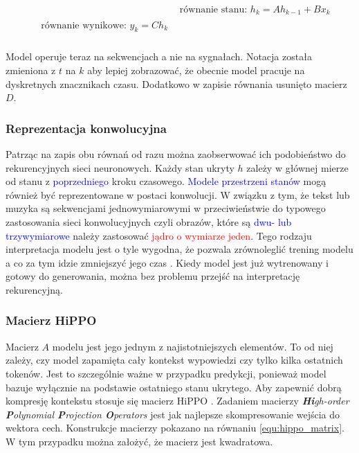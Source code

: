 \documentclass[data-science]{agh-wi} %
\begin{document}
\begin{align}
     & \text{równanie stanu: }h_k = Ah_{k-1} + Bx_k \label{equ:rownanie_stanu_seq} \\
    \begin{split}
        &\text{równanie wynikowe: }y_k = Ch_k \label{equ:rownanie_wynikowe_seq} \\
    \end{split}
\end{align}

Model operuje teraz na sekwencjach a nie na sygnałach. Notacja została zmieniona z $t$ na $k$ aby lepiej zobrazować, że obecnie model pracuje na dyskretnych znacznikach czasu. Dodatkowo w zapisie równania usunięto macierz $D$.

\subsubsection*{Reprezentacja konwolucyjna}
Patrząc na zapis obu równań od razu można zaobserwować ich podobieństwo do rekurencyjnych sieci neuronowych. Każdy stan ukryty $h$ zależy w głównej mierze od stanu z \textcolor{blue}{poprzedniego} kroku czasowego. \textcolor{blue}{Modele przestrzeni stanów} mogą również być reprezentowane w postaci konwolucji. W związku z tym, że tekst lub muzyka są sekwencjami jednowymiarowymi w przeciwieństwie do typowego zastosowania sieci konwolucyjnych czyli obrazów, które są \textcolor{blue}{dwu- lub trzywymiarowe} należy zastosować \textcolor{red}{jądro o wymiarze jeden}. Tego rodzaju interpretacja modelu jest o tyle wygodna, że pozwala zrównoleglić trening modelu a co za tym idzie zmniejszyć jego czas \cite{ssm_notacja}. Kiedy model jest już wytrenowany i gotowy do generowania, można bez problemu przejść na interpretację rekurencyjną.

\subsubsection*{Macierz HiPPO} %
Macierz $A$ modelu jest jego jednym z najistotniejszych elementów. To od niej zależy, czy model zapamięta cały kontekst wypowiedzi czy tylko kilka ostatnich tokenów. Jest to szczególnie ważne w przypadku predykcji, ponieważ model bazuje wyłącznie na podstawie ostatniego stanu ukrytego. Aby zapewnić dobrą kompresję kontekstu stosuje się macierz HiPPO \cite{hippo}. Zadaniem macierzy \textit{\textbf{Hi}gh-order \textbf{P}olynomial \textbf{P}rojection \textbf{O}perators} jest jak najlepsze skompresowanie wejścia do wektora cech. Konstrukcje macierzy pokazano na równaniu \ref*{equ:hippo_matrix}. W tym przypadku można założyć, że macierz jest kwadratowa.
\end{document}
